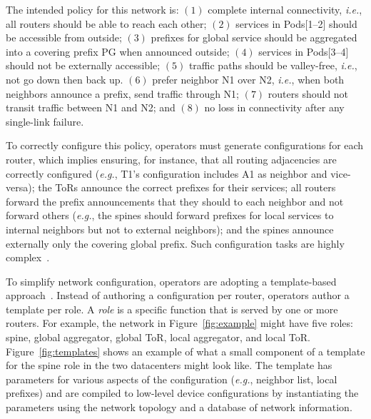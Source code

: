 \documentclass[numbers, 10pt, preprint]{sigplanconf}
\newcommand{\todo}[1]{\textcolor{red}{[TODO: #1]}}
\newcommand{\EG}{\emph{e.g.}}
\newcommand{\IE}{\emph{i.e.}}
\begin{document}


The intended policy for this network is:
$(1)$ complete internal connectivity, \IE, all routers should be able to reach each other;
$(2)$ services in Pods[1--2] should be accessible from outside;
$(3)$ prefixes for global service should be aggregated into a covering prefix PG when announced outside;
$(4)$ services in Pods[3--4] should not be externally accessible;
$(5)$ traffic paths should be valley-free, \IE, not go down then back up.
$(6)$ prefer neighbor N1 over N2, \IE, when both neighbors announce a prefix, send traffic through N1;
$(7)$ routers should not transit traffic between N1 and N2; and
$(8)$ no loss in connectivity after any single-link failure.

To correctly configure this policy, operators must generate configurations for each router, which implies ensuring, for instance, that all routing adjacencies are correctly configured (\EG, T1's configuration includes A1 as neighbor and vice-versa); the ToRs announce the correct prefixes for their services; all routers  forward the prefix announcements that they should to each neighbor and not forward others (\EG, the spines should forward prefixes for local services to internal neighbors but not to external neighbors); and the spines announce externally only the covering global prefix. Such configuration tasks are highly complex~\cite{juniper-study,bgpmon,batfish,propane}.

To simplify network configuration, operators are adopting a template-based approach~\cite{hatch,thwack}. Instead of authoring a configuration per router, operators author a template per role.
%
A {\em role} is a specific function that is served by one or more routers.
%
For example, the network in Figure~\ref{fig:example} might have five roles: spine, global aggregator, global ToR, local aggregator, and local ToR.
%
Figure~\ref{fig:templates} shows an example of what a small component of a template for the spine role in the two datacenters might look like. The template has parameters for various aspects of the configuration (\EG, neighbor list, local prefixes) and are compiled to low-level device configurations by instantiating the parameters using the network topology and a database of network information.
\end{document}
